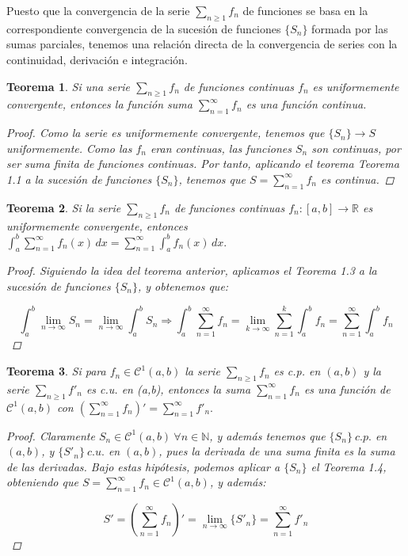 \documentclass[11pt, a4paper]{article}
\theoremstyle{theorem-style}
\newtheorem{nth}{Teorema}[section]
\theoremstyle{definition-style}
\theoremstyle{remark-style}
\theoremstyle{example-style}
\begin{document}
Puesto que  la convergencia de la serie $\sum_{n\geq 1} f_n$ de funciones se basa en la correspondiente convergencia de la sucesi\'on de funciones $\{S_n\}$ formada por las sumas parciales, tenemos una relación directa de la convergencia de series con la continuidad, derivación e integración.


\begin{nth}
Si una serie  $\sum_{n\geq 1} f_n $ de funciones continuas $f_n$ es uniformemente convergente, entonces la funci\'on suma $\displaystyle \sum_{n=1}^{\infty} f_n $ es una funci\'on continua.

\begin{proof}
Como la serie es uniformemente convergente, tenemos que $\{S_n\} \to S$ uniformemente. Como las $f_n$ eran continuas, las funciones $S_n$ son continuas, por ser suma finita de funciones continuas. Por tanto, aplicando el teorema \textit{Teorema 1.1} a la sucesión de funciones $\{S_n\}$, tenemos que $S = \sum_{n=1}^{\infty} f_n$ es continua.
\end{proof}
\end{nth}


\begin{nth}
Si la serie $\sum_{n\geq 1} f_n $ de funciones continuas $f_n:[a,b]\longrightarrow \mathbb R$ es uniformemente convergente, entonces 
$
\displaystyle \int_a^b \sum_{n=1}^{\infty} f_n (x) \, dx =  \sum_{n=1}^{\infty} \int_a^b f_n (x) \, dx  .
$

\begin{proof}
Siguiendo la idea del teorema anterior, aplicamos el \textit{Teorema 1.3} a la sucesión de funciones $\{S_n\}$, y obtenemos que:

$$\int_a^b \lim_{n \to \infty} S_n = \lim_{n \to \infty} \int_a^b S_n \Rightarrow \int_a^b \sum_{n=1}^{\infty} f_n = \lim_{k \to \infty} \sum_{n=1}^k \int_a^b f_n = \sum_{n =1}^{\infty} \int_a^b f_n$$
\end{proof}
\end{nth}


\begin{nth}
Si para $f_n\in \mathcal{C}^1(a,b)$  la serie  $\sum_{n\geq 1} f_n $ es  c.p.  en $(a,b)$ y  la serie  $ \sum_{n\geq 1} f'_n $ es  c.u. en (a,b), entonces la suma $\displaystyle \sum_{n=1}^{\infty} f_n $ es una funci\'on de  $\mathcal{C}^1(a,b)$ con 
$
\displaystyle \left( \sum_{n=1}^{\infty} f_n \right)' =  \sum_{n=1}^{\infty}  f'_n  .
$

\begin{proof}
Claramente $S_n \in \mathcal{C}^1(a,b)\ \forall n \in \mathbb{N}$, y además tenemos que $\{S_n\}\ c.p.$ en $(a,b)$, y $\{S'_n\}\ c.u.$ en $(a,b)$, pues la derivada de una suma finita es la suma de las derivadas. Bajo estas hipótesis, podemos aplicar a $\{S_n\}$ el \textit{Teorema 1.4}, obteniendo que $S = \sum_{n=1}^{\infty} f_n \in \mathcal{C}^1(a,b)$, y además:

$$S' = \left( \sum_{n=1}^{\infty} f_n \right)' = \lim_{n \to \infty} \{S'_n\} = \sum_{n=1}^{\infty} f'_n$$
\end{proof}
\end{nth}
\end{document}
